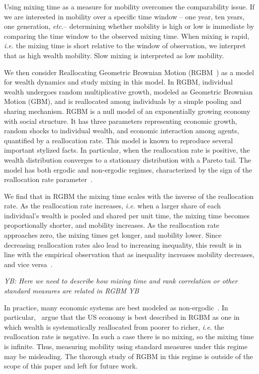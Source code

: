 \documentclass[11pt]{article}
\newcommand{\blue}[1]{{\color{blue} #1}}
\newcommand{\ie}{{\it i.e.}\xspace}
\newcommand{\etc}{{\it etc.}\xspace}
\newcommand{\YB}[1]{\blue{{\it YB: #1 YB}}}
\numberwithin{equation}{section}
\begin{document}
Using mixing time as a measure for mobility overcomes the comparability issue. If we are interested in mobility over a specific time window -- one year, ten years, one generation, \etc -- determining whether mobility is high or low is immediate by comparing the time window to the observed mixing time. When mixing is rapid, \ie the mixing time is short relative to the window of observation, we interpret that as high wealth mobility. Slow mixing is interpreted as low mobility.

We then consider Reallocating Geometric Brownian Motion (RGBM~\citep{MarsiliMaslovZhang1998,LiuSerota2017,BermanPetersAdamou2019}) as a model for wealth dynamics and study mixing in this model. In RGBM, individual wealth undergoes random multiplicative growth, modeled as Geometric Brownian Motion (GBM), and is reallocated among individuals by a simple pooling and sharing mechanism. RGBM is a null model of an exponentially growing economy with social structure. It has three parameters representing economic growth, random shocks to individual wealth, and economic interaction among agents, quantified by a reallocation rate. This model is known to reproduce several important stylized facts. In particular, when the reallocation rate is positive, the wealth distribution converges to a stationary distribution with a Pareto tail. The model has both ergodic and non-ergodic regimes, characterized by the sign of the reallocation rate parameter~\citep{BermanPetersAdamou2019}.

We find that in RGBM the mixing time scales with the inverse of the reallocation rate. As the reallocation rate increases, \ie when a larger share of each individual's wealth is pooled and shared per unit time, the mixing time becomes proportionally shorter, and mobility increases. As the reallocation rate approaches zero, the mixing times get longer, and mobility lower. Since decreasing reallocation rates also lead to increasing inequality, this result is in line with the empirical observation that as inequality increases mobility decreases, and vice versa~\citep{corak2013}.

\YB{Here we need to describe how mixing time and rank correlation or other standard measures are related in RGBM}

In practice, many economic systems are best modeled as non-ergodic~\citep{Peters2019b}. In particular,~\citet{BermanPetersAdamou2019} argue that the US economy is best described in RGBM as one in which wealth is systematically reallocated from poorer to richer, \ie the reallocation rate is negative. In such a case there is no mixing, so the mixing time is infinite. Thus, measuring mobility using standard measures under this regime may be misleading. The thorough study of RGBM in this regime is outside of the scope of this paper and left for future work.
\end{document}
